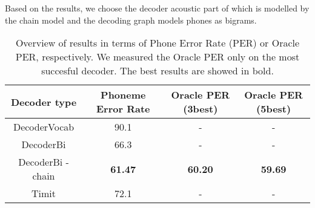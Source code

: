 Based on the results, we choose the decoder acoustic part of which is modelled by the chain model and the decoding graph models phones as bigrams.
\begin{table}
\centering
\begin{tabular}{ |c|c|c|c| } 
 \hline
 Decoder type & Phoneme Error Rate & Oracle PER (3best) & Oracle PER (5best) \\ 
 \hline
 DecoderVocab & 90.1 & - & - \\ 
 \hline
 DecoderBi & 66.3 & - & - \\
 \hline
 DecoderBi - chain & \textbf{61.47} & \textbf{60.20} & \textbf{59.69} \\
 \hline
 Timit & 72.1 & - & - \\
 \hline
\end{tabular}
\label{PERtable}
\caption{Overview of results in terms of Phone Error Rate (PER) or Oracle PER, respectively. We measured the Oracle PER only on the most succesful decoder. The best results are showed in bold.}
\end{table}
